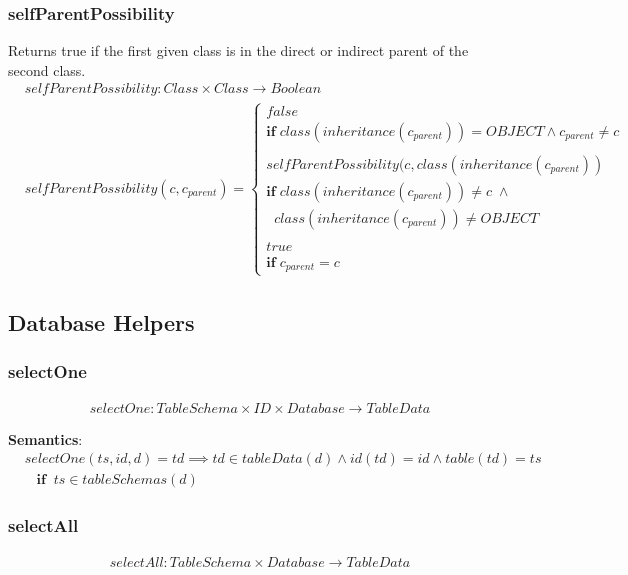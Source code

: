 \documentclass[10pt]{article}
\begin{document}
\subsubsection{selfParentPossibility}
Returns true if the first given class is in the direct or indirect parent of the second class. 
\begin{align}
& selfParentPossibility: Class \times  Class \rightarrow Boolean \\
& selfParentPossibility(c, c_{parent}) = \begin{cases}
 false \\
 \mathbf{if} \; class(inheritance(c_{parent})) = OBJECT \land c_{parent} \neq c \\\\
 selfParentPossibility(c, class(inheritance(c_{parent}))\\
 \mathbf{if} \; class(inheritance(c_{parent})) \neq c \; \land  \\ \;\; class(inheritance(c_{parent})) \neq OBJECT \\\\
 true \\
 \mathbf{if} \; c_{parent} = c
 \end{cases}
\end{align}

\subsection{Database Helpers}

\subsubsection{selectOne}
\begin{align}
selectOne: TableSchema \times ID \times  Database \rightarrow TableData
\end{align}

\textbf{Semantics}:
\begin{align}
& selectOne(ts, id, d) = td \implies td \in tableData(d) \land id(td) = id \land table(td) = ts \nonumber \\
& \;\;\; \mathbf{if}  \;\; ts \in tableSchemas(d)
\end{align}

\subsubsection{selectAll}
\begin{align}
selectAll: TableSchema \times  Database \rightarrow TableData
\end{align}
\end{document}
